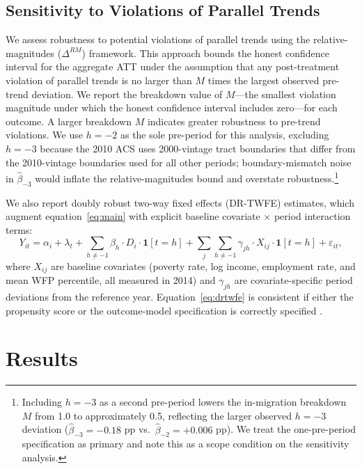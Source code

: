 \documentclass[12pt]{article}
\begin{document}
\subsection{Sensitivity to Violations of Parallel Trends}

We assess robustness to potential violations of parallel trends
using the \citet{rambachan2023more} relative-magnitudes ($\Delta^{RM}$)
framework.
This approach bounds the honest confidence interval for the aggregate ATT
under the assumption that any post-treatment violation of parallel trends
is no larger than $M$ times the largest observed pre-trend deviation.
We report the breakdown value of $M$---the smallest violation magnitude
under which the honest confidence interval includes zero---for each outcome.
A larger breakdown $M$ indicates greater robustness to pre-trend violations.
We use $h = -2$ as the sole pre-period for this analysis, excluding
$h = -3$ because the 2010 ACS uses 2000-vintage tract boundaries
that differ from the 2010-vintage boundaries used for all other periods;
boundary-mismatch noise in $\hat{\beta}_{-3}$ would inflate the
relative-magnitudes bound and overstate robustness.\footnote{%
  Including $h = -3$ as a second pre-period lowers the in-migration
  breakdown $M$ from 1.0 to approximately 0.5, reflecting the larger
  observed $h = -3$ deviation ($\hat{\beta}_{-3} = -0.18$ pp vs.\
  $\hat{\beta}_{-2} = +0.006$ pp).
  We treat the one-pre-period specification as primary and note this
  as a scope condition on the sensitivity analysis.}

We also report doubly robust two-way fixed effects (DR-TWFE) estimates,
which augment equation~\eqref{eq:main} with explicit baseline covariate
$\times$ period interaction terms:
\begin{equation}
  Y_{it} = \alpha_i + \lambda_t
    + \sum_{h \neq -1} \beta_h \cdot D_i \cdot \mathbf{1}[t = h]
    + \sum_{j} \sum_{h \neq -1} \gamma_{jh} \cdot X_{ij} \cdot \mathbf{1}[t = h]
    + \varepsilon_{it},
  \label{eq:drtwfe}
\end{equation}
where $X_{ij}$ are baseline covariates (poverty rate, log income,
employment rate, and mean WFP percentile, all measured in 2014)
and $\gamma_{jh}$ are covariate-specific period deviations from the
reference year.
Equation~\eqref{eq:drtwfe} is consistent if either the propensity score
or the outcome-model specification is correctly specified
\citep{callaway2021difference}.


\section{Results}
\label{sec:results}
\end{document}
